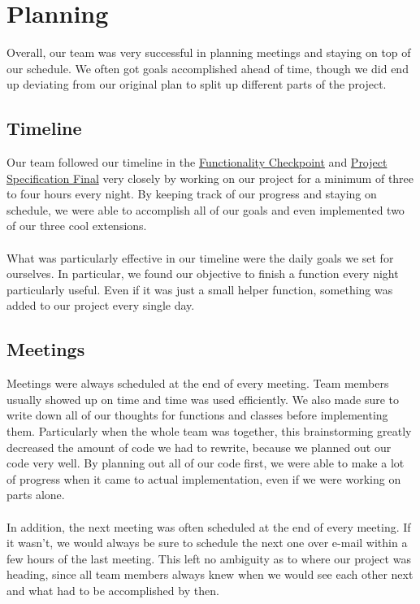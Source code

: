 \documentclass[11pt]{article}
\begin{document}
\pagebreak


\section{Planning}

Overall, our team was very successful in planning meetings and staying on top of our schedule. We often got goals accomplished ahead of time, though we did end up deviating from our original plan to split up different parts of the project.

\subsection{Timeline}

Our team followed our timeline in the \href{run:report/Functionality_Checkpoint Ann..pdf}{Functionality Checkpoint} and \href{run:report/Final Project Specification (Final) Ann..pdf}{Project Specification Final} very closely by working on our project for a minimum of three to four hours every night. By keeping track of our progress and staying on schedule, we were able to accomplish all of our goals and even implemented two of our three cool extensions.
\\\\
What was particularly effective in our timeline were the daily goals we set for ourselves. In particular, we found our objective to finish a function every night particularly useful. Even if it was just a small helper function, something was added to our project every single day.


\subsection{Meetings}

Meetings were always scheduled at the end of every meeting. Team members usually showed up on time and time was used efficiently. We also made sure to write down all of our thoughts for functions and classes before implementing them. Particularly when the whole team was together, this brainstorming greatly decreased the amount of code we had to rewrite, because we planned out our code very well. By planning out all of our code first, we were able to make a lot of progress when it  came to actual implementation, even if we were working on parts alone.
\\\\
In addition, the next meeting was often scheduled at the end of every meeting. If it wasn't, we would always be sure to schedule the next one over e-mail within a few hours of the last meeting. This left no ambiguity as to where our project was heading, since all team members always knew when we would see each other next and what had to be accomplished by then.
\end{document}
